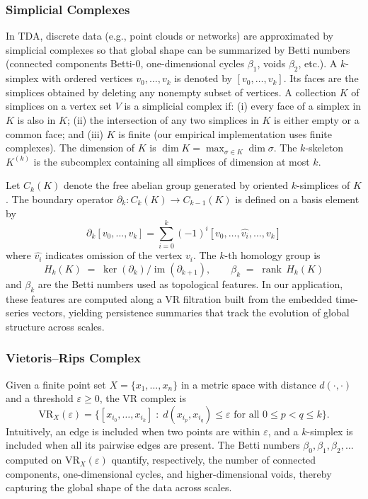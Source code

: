 \documentclass[11pt,reqno]{amsart}
\numberwithin{equation}{section} %
\begin{document}
\subsubsection{Simplicial Complexes}
In TDA, discrete data (e.g., point clouds or networks) are approximated by simplicial complexes so that global shape can be summarized by Betti numbers (connected components Betti-0, one-dimensional cycles \(\beta_1\), voids \(\beta_2\), etc.)\citep{RN2692}. 
A \(k\)-simplex with ordered vertices \(v_0,\ldots,v_k\) is denoted by \([v_0,\ldots,v_k]\). Its faces are the simplices obtained by deleting any nonempty subset of vertices. A collection \(K\) of simplices on a vertex set \(V\) is a simplicial complex if:
(i) every face of a simplex in \(K\) is also in \(K\);
(ii) the intersection of any two simplices in \(K\) is either empty or a common face; and
(iii) \(K\) is finite (our empirical implementation uses finite complexes).
The dimension of \(K\) is \(\dim K = \max_{\sigma \in K} \dim \sigma\). The \(k\)-skeleton \(K^{(k)}\) is the subcomplex containing all simplices of dimension at most \(k\).

Let \(C_k(K)\) denote the free abelian group generated by oriented \(k\)-simplices of \(K\).
The boundary operator \(\partial_k : C_k(K) \to C_{k-1}(K)\) is defined on a basis element by
\begin{equation}
\partial_k [v_0,\ldots,v_k]
=
\sum_{i=0}^{k} (-1)^i [v_0,\ldots,\widehat{v_i},\ldots,v_k]
\label{eq:boundary}
\end{equation}
where \(\widehat{v_i}\) indicates omission of the vertex \(v_i\).
The \(k\)-th homology group is
\begin{equation}
H_k(K) \;=\; \ker(\partial_k)\big/\operatorname{im}(\partial_{k+1}),
\qquad
\beta_k \;=\; \operatorname{rank}\, H_k(K)
\label{eq:homology}
\end{equation}
and \(\beta_k\) are the Betti numbers used as topological features. In our application, these features are computed along a VR filtration built from the embedded time-series vectors, yielding persistence summaries that track the evolution of global structure across scales.

\subsubsection{Vietoris--Rips Complex}
Given a finite point set \(X=\{x_1,\ldots,x_n\}\) in a metric space with distance \(d(\cdot,\cdot)\) and a threshold \(\varepsilon \ge 0\), the VR complex is
\begin{equation}
\mathrm{VR}_X(\varepsilon)
= \big\{ [x_{i_0},\ldots,x_{i_k}] \;:\; d(x_{i_p},x_{i_q}) \le \varepsilon \text{ for all } 0\le p<q\le k \big\}.
\label{eq:vr-def}
\end{equation}
Intuitively, an edge is included when two points are within \(\varepsilon\), and a \(k\)-simplex is included when all its pairwise edges are present. The Betti numbers \(\beta_0,\beta_1,\beta_2,\ldots\) computed on \(\mathrm{VR}_X(\varepsilon)\) quantify, respectively, the number of connected components, one-dimensional cycles, and higher-dimensional voids, thereby capturing the global shape of the data across scales\citep{RN2693}.
\end{document}
